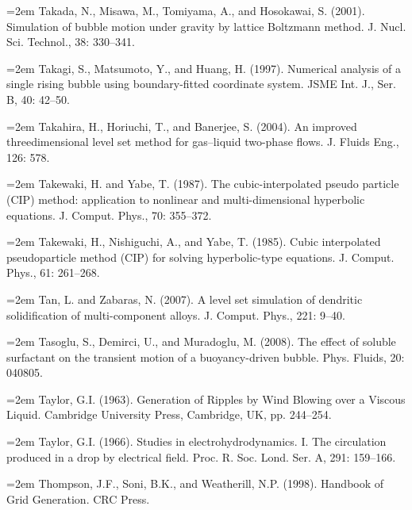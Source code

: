 \documentclass[11pt,a4paper,openany,fontset=none]{ctexbook}
\begin{document}
\par\hangindent=2em Takada, N., Misawa, M., Tomiyama, A., and Hosokawai, S. (2001). Simulation of bubble motion under gravity by lattice Boltzmann method. J. Nucl. Sci. Technol., 38: 330--341.

\par\hangindent=2em Takagi, S., Matsumoto, Y., and Huang, H. (1997). Numerical analysis of a single rising bubble using boundary-fitted coordinate system. JSME Int. J., Ser. B, 40: 42--50.

\par\hangindent=2em Takahira, H., Horiuchi, T., and Banerjee, S. (2004). An improved threedimensional level set method for gas--liquid two-phase flows. J. Fluids Eng., 126: 578.

\par\hangindent=2em Takewaki, H. and Yabe, T. (1987). The cubic-interpolated pseudo particle (CIP) method: application to nonlinear and multi-dimensional hyperbolic equations. J. Comput. Phys., 70: 355--372.

\par\hangindent=2em Takewaki, H., Nishiguchi, A., and Yabe, T. (1985). Cubic interpolated pseudoparticle method (CIP) for solving hyperbolic-type equations. J. Comput. Phys., 61: 261--268.

\par\hangindent=2em Tan, L. and Zabaras, N. (2007). A level set simulation of dendritic solidification of multi-component alloys. J. Comput. Phys., 221: 9--40.

\par\hangindent=2em Tasoglu, S., Demirci, U., and Muradoglu, M. (2008). The effect of soluble surfactant on the transient motion of a buoyancy-driven bubble. Phys. Fluids, 20: 040805.

\par\hangindent=2em Taylor, G.I. (1963). Generation of Ripples by Wind Blowing over a Viscous Liquid. Cambridge University Press, Cambridge, UK, pp. 244--254.


\par\hangindent=2em Taylor, G.I. (1966). Studies in electrohydrodynamics. I. The circulation produced in a drop by electrical field. Proc. R. Soc. Lond. Ser. A, 291: 159--166.

\par\hangindent=2em Thompson, J.F., Soni, B.K., and Weatherill, N.P. (1998). Handbook of Grid Generation. CRC Press.
\end{document}
